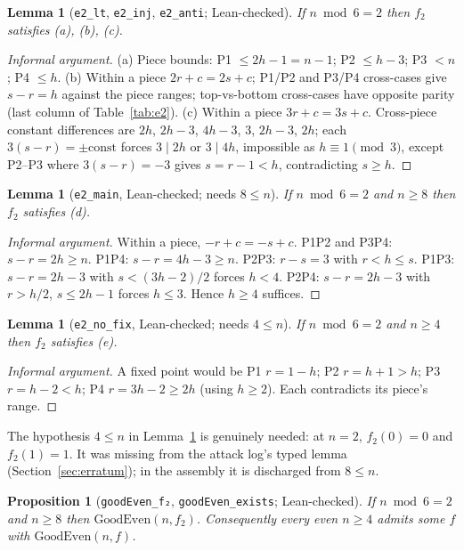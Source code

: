 \documentclass[11pt,a4paper]{article}
\newtheorem{lemma}[theorem]{Lemma}
\newtheorem{proposition}[theorem]{Proposition}
\theoremstyle{definition}
\theoremstyle{remark}
\newcommand{\lean}[1]{\texttt{#1}}
\newcommand{\GoodEven}{\mathrm{GoodEven}}
\begin{document}
\begin{lemma}[\lean{e2\_lt}, \lean{e2\_inj}, \lean{e2\_anti}; Lean-checked]
If $n\bmod 6=2$ then $f_2$ satisfies (a), (b), (c).
\end{lemma}
\begin{proof}[Informal argument]
(a) Piece bounds: P1 $\le 2h-1=n-1$; P2 $\le h-3$; P3 $<n$; P4 $\le h$.
(b) Within a piece $2r+c=2s+c$; P1/P2 and P3/P4 cross-cases give $s-r=h$ against the
piece ranges; top-vs-bottom cross-cases have opposite parity (last column of
Table~\ref{tab:e2}).
(c) Within a piece $3r+c=3s+c$. Cross-piece constant differences are $2h$, $2h-3$,
$4h-3$, $3$, $2h-3$, $2h$; each $3(s-r)=\pm\text{const}$ forces $3\mid 2h$ or
$3\mid 4h$, impossible as $h\equiv 1\pmod 3$, except P2--P3 where $3(s-r)=-3$ gives
$s=r-1<h$, contradicting $s\ge h$.
\end{proof}

\begin{lemma}[\lean{e2\_main}, Lean-checked; needs $8\le n$]
If $n\bmod 6=2$ and $n\ge 8$ then $f_2$ satisfies (d).
\end{lemma}
\begin{proof}[Informal argument]
Within a piece, $-r+c=-s+c$. P1P2 and P3P4: $s-r=2h\ge n$. P1P4: $s-r=4h-3\ge n$.
P2P3: $r-s=3$ with $r<h\le s$. P1P3: $s-r=2h-3$ with $s<(3h-2)/2$ forces $h<4$.
P2P4: $s-r=2h-3$ with $r>h/2$, $s\le 2h-1$ forces $h\le 3$. Hence $h\ge 4$ suffices.
\end{proof}

\begin{lemma}[\lean{e2\_no\_fix}, Lean-checked; needs $4\le n$]
\label{lem:e2nofix}
If $n\bmod 6=2$ and $n\ge 4$ then $f_2$ satisfies (e).
\end{lemma}
\begin{proof}[Informal argument]
A fixed point would be P1 $r=1-h$; P2 $r=h+1>h$; P3 $r=h-2<h$; P4 $r=3h-2\ge 2h$
(using $h\ge 2$). Each contradicts its piece's range.
\end{proof}

The hypothesis $4\le n$ in Lemma~\ref{lem:e2nofix} is genuinely needed: at $n=2$,
$f_2(0)=0$ and $f_2(1)=1$. It was missing from the attack log's typed lemma
(Section~\ref{sec:erratum}); in the assembly it is discharged from $8\le n$.

\begin{proposition}[\lean{goodEven\_f₂}, \lean{goodEven\_exists}; Lean-checked]
If $n\bmod 6=2$ and $n\ge 8$ then $\GoodEven(n,f_2)$. Consequently every even $n\ge 4$
admits some $f$ with $\GoodEven(n,f)$.
\end{proposition}
\end{document}
